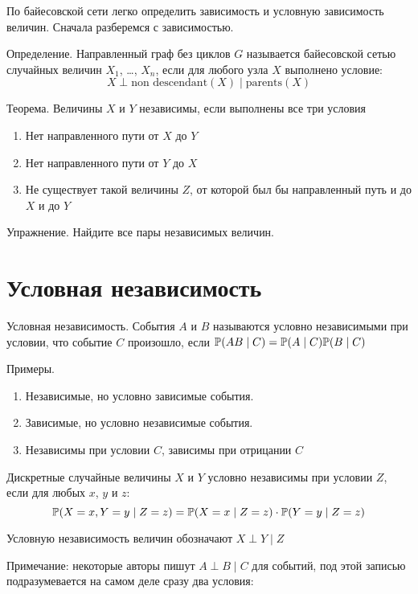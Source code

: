 По байесовской сети легко определить зависимость и условную зависимость величин. Сначала разберемся с зависимостью.

Определение. Направленный граф без циклов $G$ называется байесовской сетью случайных величин $X_1$, \ldots, $X_n$, если для любого узла $X$ выполнено условие:
\begin{equation}
X \perp \mbox{non descendant}(X) \mid \mbox{parents}(X)
\end{equation}


Теорема. Величины $X$ и $Y$ независимы, если выполнены все три условия 
\begin{enumerate}
\item Нет направленного пути от $X$ до $Y$
\item Нет направленного пути от $Y$ до $X$
\item Не существует такой величины $Z$, от которой был бы направленный путь и до $X$ и до $Y$
\end{enumerate}


Упражнение. Найдите все пары независимых величин.

\section{Условная независимость}

Условная независимость. События $A$ и $B$ называются условно независимыми при условии, что событие $C$ произошло, если $\P(AB \mid C)=\P(A \mid C)\P(B \mid C)$

Примеры.
\begin{enumerate}
\item Независимые, но условно зависимые события.
\item Зависимые, но условно независимые события.
\item Независимы при условии $C$, зависимы при отрицании $C$
\end{enumerate}

Дискретные случайные величины $X$ и $Y$ условно независимы при условии $Z$, если для любых $x$, $y$ и $z$:
\begin{equation}
\P(X=x,Y=y \mid Z=z) = \P(X=x \mid Z=z)\cdot \P(Y=y \mid Z=z)
\end{equation}

Условную независимость величин обозначают $X \perp Y \mid Z$


Примечание: некоторые авторы пишут $A \perp B \mid C$ для событий, под этой записью подразумевается на самом деле сразу два условия:

